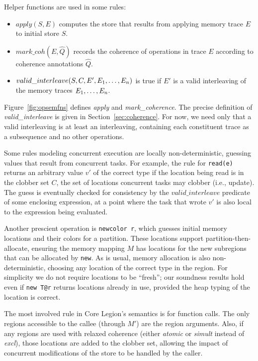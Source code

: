 Helper functions are used in some rules:
\begin{itemize}
\item $apply(S, E)$ computes the store that results from applying memory trace $E$ to initial store $S$.

\item $mark\_coh(E, \hat Q)$ records the coherence of operations in trace $E$ according to coherence annotations $\hat Q$. 

\item $valid\_interleave(S, C, E', {E}_1,\ldots,{E}_n)$ is true if $E'$ is a valid interleaving
of the memory traces ${E}_1,\ldots,{E}_n$.
\end{itemize}
Figure~\ref{fig:opsemfns} defines {\em apply} and {\em mark\_coherence}.  The precise definition of
{\em valid\_interleave} is given in Section~\ref{sec:coherence}.  For now, we need only that a valid interleaving
is at least an interleaving, containing each constituent trace as a subsequence and no other operations.

Some rules modeling concurrent execution are locally
non-deterministic, guessing values that result from
concurrent tasks.  For example, the rule for {\tt read(e)} returns an
arbitrary value $v'$ of the correct type if the location being read is
in the clobber set $C$, the set of locations concurrent tasks may
clobber (i.e., update).  The guess is eventually checked for
consistency by the $valid\_interleave$ predicate of some enclosing
expression, at a point where the task that wrote $v'$ is also local to
the expression being evaluated.

Another prescient operation is {\tt newcolor r}, which guesses initial
memory locations and their colors for a partition.  These locations
support partition-then-allocate, ensuring the memory mapping $M$ has
locations for the new subregions that can be allocated by {\tt new}.
As is usual, memory allocation is also non-deterministic, choosing any
location of the correct type in the region.  For simplicity we do not
require locations to be ``fresh''; our soundness results hold even if
{\tt new T@r} returns locations already in use, provided the heap
typing of the location is correct.

The most involved rule in Core Legion's semantics is for function calls.
The only regions accessible to the callee (through $M'$) are the region arguments.
Also, if any regions are used with relaxed coherence (either {\em atomic} or {\em simult} instead of
{\em excl}), those locations are added to the clobber set, allowing the
impact of concurrent modifications of the store to be handled by the caller.  

